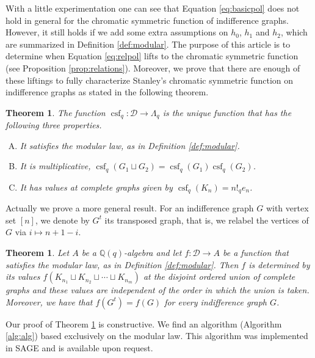 \documentclass[10pt]{amsart}
\newtheorem{Thm}[Lem]{Theorem}
\theoremstyle{definition}
\newcommand{\col}{\colon}
\newcommand{\D}{\mathcal{D}}
\DeclareMathOperator{\csf}{csf}
\begin{document}
     With a little experimentation one can see that Equation \eqref{eq:basicpol} does not hold in general for the chromatic symmetric function of indifference graphs. However, it still holds if we add some extra assumptions on $h_0$, $h_1$ and $h_2$, which are summarized in Definition \ref{def:modular}. The purpose of this article is to determine when Equation \eqref{eq:relpol} lifts to the chromatic symmetric function (see Proposition \ref{prop:relations}). Moreover, we prove that there are enough of these liftings  to fully characterize Stanley's chromatic symmetric function on indifference graphs as stated in the following theorem.





    \begin{Thm}
    The function $\csf_q\col \D\to \Lambda_q$ is the unique function that has the following three properties.
    \begin{enumerate}[(A)]
    \item\label{item:At} It satisfies the modular law, as in Definition \ref{def:modular}.
    \item\label{item:Bt} It is multiplicative, $\csf_q(G_1\sqcup G_2)=\csf_q(G_1)\csf_q(G_2)$.
    \item It has values at complete graphs given by $\csf_q(K_n)=n!_qe_n$.
    \end{enumerate}
    \end{Thm}

    Actually we prove a more general result. For an indifference graph $G$ with vertex set $[n]$, we denote by $G^t$ its transposed graph, that is, we relabel the vertices of $G$ via $i\mapsto n+1-i$.

    \begin{Thm}
    \label{thm:main}
    Let $A$ be a $\mathbb{Q}(q)$-algebra and let $f\col \D\to A$  be a function  that satisfies the modular law, as in Definition \ref{def:modular}. Then $f$ is determined by its values $f(K_{n_1}\sqcup K_{n_2}\sqcup\cdots\sqcup K_{n_m})$ at the disjoint ordered union of complete graphs and these values are independent of the order in which the union is taken. Moreover, we have that $f(G^{t})=f(G)$ for every indifference graph $G$.
    \end{Thm}
    Our proof of Theorem \ref{thm:main} is constructive. We find an algorithm (Algorithm \ref{alg:alg}) based exclusively on the modular law. This algorithm was implemented in SAGE and is available upon request. \par
    
\end{document}
